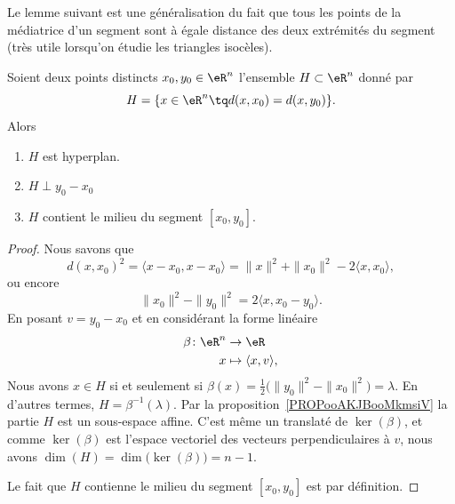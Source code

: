 Le lemme suivant est une généralisation du fait que tous les points de la médiatrice d'un segment sont à égale distance des deux extrémités du segment (très utile lorsqu'on étudie les triangles isocèles).
\begin{lemma}        \label{LEMooDPLYooJKZxiM}
	Soient deux points distincts \( x_0,y_0\in \eR^n\) l'ensemble \( H\subset \eR^n\) donné par
	\begin{equation}
		H=\{ x\in \eR^n\tq d(x,x_0)=d(x,y_0) \}.
	\end{equation}
	Alors
	\begin{enumerate}
		\item
		      \( H\) est hyperplan.
		\item
		      \( H\perp  y_0-x_0\)
		\item
		      \( H\) contient le milieu du segment \( [x_0,y_0]\).
	\end{enumerate}
\end{lemma}

\begin{proof}
	Nous savons que
	\begin{equation}
		d(x,x_0)^2=\langle x-x_0, x-x_0\rangle =\| x \|^2+\| x_0 \|^2-2\langle x, x_0\rangle,
	\end{equation}
	ou encore
	\begin{equation}
		\| x_0 \|^2-\| y_0 \|^2=2\langle x, x_0-y_0\rangle .
	\end{equation}
	En posant \( v=y_0-x_0\) et en considérant la forme linéaire
	\begin{equation}
		\begin{aligned}
			\beta\colon \eR^n & \to \eR                       \\
			x                 & \mapsto \langle x, v\rangle ,
		\end{aligned}
	\end{equation}
	Nous avons \( x\in H\) si et seulement si \( \beta(x)=\frac{ 1 }{2}\big( \| y_0 \|^2-\| x_0 \|^2 \big)=\lambda\). En d'autres termes, \( H=\beta^{-1}(\lambda)\). Par la proposition~\ref{PROPooAKJBooMkmsiV} la partie \( H\) est un sous-espace affine. C'est même un translaté de \( \ker(\beta)\), et comme \( \ker(\beta)\) est l'espace vectoriel des vecteurs perpendiculaires à \( v\), nous avons \( \dim(H)=\dim\big( \ker(\beta) \big)=n-1\).

	Le fait que \( H\) contienne le milieu du segment \( [x_0,y_0]\) est par définition.
\end{proof}

